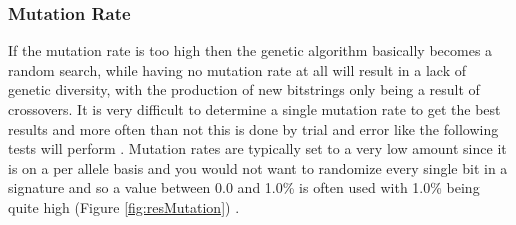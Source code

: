 \newpage
\subsubsection{Mutation Rate} \label{sec:resMutation}

If the mutation rate is too high then the genetic algorithm basically becomes a random search, while having no mutation rate at all will result in a lack of genetic diversity, with the production of new bitstrings only being a result of crossovers.  It is very difficult to determine a single mutation rate to get the best results and more often than not this is done by trial and error like the following tests will perform \cite{aNewStrategy}.  Mutation rates are typically set to a very low amount since it is on a per allele basis and you would not want to randomize every single bit in a signature and so a value between 0.0 and 1.0\% is often used with 1.0\% being quite high (Figure \ref{fig:resMutation}) \cite{optimizationOfControlParameters}.

